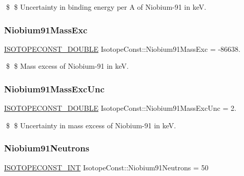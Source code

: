 \$ \$ Uncertainty in binding energy per A of Niobium-\/91 in keV. \mbox{\label{group___isotope_const-_niobium-_nb91_gad4294df47c1912f92d9124cba68e5edd}} 
\subsubsection{\texorpdfstring{Niobium91\+Mass\+Exc}{Niobium91MassExc}}
{\footnotesize\ttfamily \mbox{\hyperlink{group___isotope_const-_macros_ga8f45a7272ce02c0b4c65c44636ed719a}{I\+S\+O\+T\+O\+P\+E\+C\+O\+N\+S\+T\+\_\+\+D\+O\+U\+B\+LE}} Isotope\+Const\+::\+Niobium91\+Mass\+Exc = -\/86638.}

\$ \$ Mass excess of Niobium-\/91 in keV. \mbox{\label{group___isotope_const-_niobium-_nb91_ga56a2497fe047726bbfbafd727b5be4db}} 
\subsubsection{\texorpdfstring{Niobium91\+Mass\+Exc\+Unc}{Niobium91MassExcUnc}}
{\footnotesize\ttfamily \mbox{\hyperlink{group___isotope_const-_macros_ga8f45a7272ce02c0b4c65c44636ed719a}{I\+S\+O\+T\+O\+P\+E\+C\+O\+N\+S\+T\+\_\+\+D\+O\+U\+B\+LE}} Isotope\+Const\+::\+Niobium91\+Mass\+Exc\+Unc = 2.}

\$ \$ Uncertainty in mass excess of Niobium-\/91 in keV. \mbox{\label{group___isotope_const-_niobium-_nb91_ga88da500b9d5f660ec8b7347fa6518f84}} 
\subsubsection{\texorpdfstring{Niobium91\+Neutrons}{Niobium91Neutrons}}
{\footnotesize\ttfamily \mbox{\hyperlink{group___isotope_const-_macros_ga5f18360b3e99483a35c32d789e62621c}{I\+S\+O\+T\+O\+P\+E\+C\+O\+N\+S\+T\+\_\+\+I\+NT}} Isotope\+Const\+::\+Niobium91\+Neutrons = 50}

